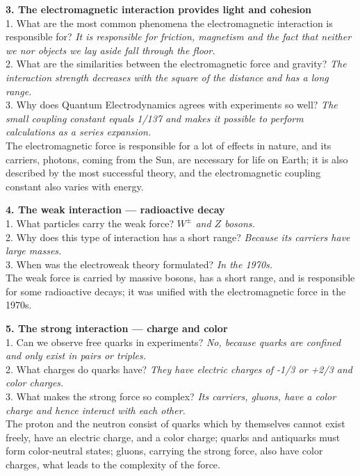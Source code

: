 \documentclass[a4paper, 12pt]{article}
\def\ans#1{\textit{#1}}
\begin{document}
\begin{multicols}{2}
\textbf{3. The electromagnetic interaction provides light and cohesion}
\\1. What are the most common phenomena the electromagnetic interaction is responsible for? \ans{It is responsible for friction, magnetism and the fact that neither we nor objects we lay aside fall through the floor.}
\\2. What are the similarities between the electromagnetic force and gravity? \ans{The interaction strength decreases with the square of the distance and has a long range.}
\\3. Why does Quantum Electrodynamics agrees with experiments so well? \ans{The small coupling constant equals 1/137 and makes it possible to perform calculations as a series expansion.}
\\ The electromagnetic force is responsible for a lot of effects in nature, and its carriers, photons, coming from the Sun, are necessary for life on Earth; it is also described by the most successful theory, and the electromagnetic coupling constant also varies with energy.

\textbf{4. The weak interaction --- radioactive decay}
\\1. What particles carry the weak force? \ans{$W^\pm$ and $Z$ bosons.}
\\2. Why does this type of interaction has a short range? \ans{Because its carriers have large masses.}
\\3. When was the electroweak theory formulated? \ans{In the 1970s.}
\\ The weak force is carried by massive bosons, has a short range, and is responsible for some radioactive decays; it was unified with the electromagnetic force in the 1970s.

\textbf{5. The strong interaction --- charge and color}
\\1. Can we observe free quarks in experiments? \ans{No, because quarks are confined and only exist in pairs or triples.}
\\2. What charges do quarks have? \ans{They have electric charges of -1/3 or +2/3 and color charges.}
\\3. What makes the strong force so complex? \ans{Its carriers, gluons, have a color charge and hence interact with each other.}
\\ The proton and the neutron consist of quarks which by themselves cannot exist freely, have an electric charge, and a color charge; quarks and antiquarks must form color-neutral states; gluons, carrying the strong force, also have color charges, what leads to the complexity of the force.


\end{multicols}
\end{document}
